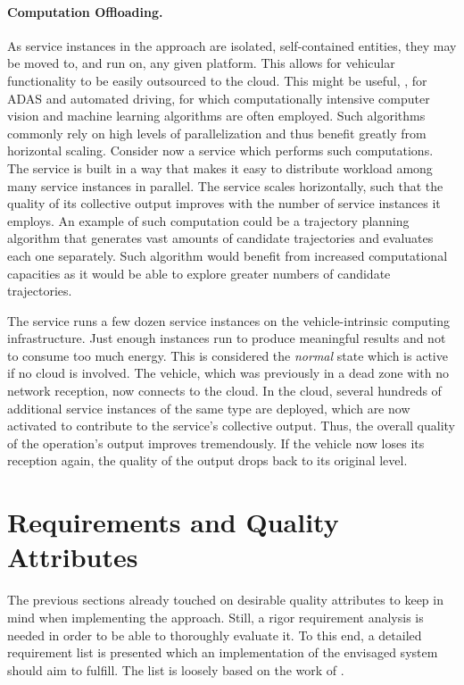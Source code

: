 \paragraph{Computation Offloading.}
As service instances in the approach are isolated, self-contained entities, they may be moved to, and run on, any given platform. This allows for vehicular functionality to be easily outsourced to the cloud. This might be useful, \eg , for ADAS and automated driving, for which computationally intensive computer vision and machine learning algorithms are often employed. Such algorithms commonly rely on high levels of parallelization and thus benefit greatly from horizontal scaling. Consider now a service which performs such computations. The service is built in a way that makes it easy to distribute workload among many service instances in parallel. The service scales horizontally, such that the quality of its collective output improves with the number of service instances it employs. An example of such computation could be a trajectory planning algorithm that generates vast amounts of candidate trajectories and evaluates each one separately. Such algorithm would benefit from increased computational capacities as it would be able to explore greater numbers of candidate trajectories.

The service runs a few dozen service instances on the vehicle-intrinsic computing infrastructure. Just enough instances run to produce meaningful results and not to consume too much energy. This is considered the \emph{normal} state which is active if no cloud is involved. The vehicle, which was previously in a dead zone with no network reception, now connects to the cloud. In the cloud, several hundreds of additional service instances of the same type are deployed, which are now activated to contribute to the service's collective output. Thus, the overall quality of the operation's output improves tremendously. If the vehicle now loses its reception again, the quality of the output drops back to its original level.

%
%
%
%
%
%
%
%
%
%
\section{Requirements and Quality Attributes} \label{sec:requirements}
The previous sections already touched on desirable quality attributes to keep in mind when implementing the approach. Still, a rigor requirement analysis is needed in order to be able to thoroughly evaluate it. To this end, a detailed requirement list is presented which an implementation of the envisaged system should aim to fulfill. The list is loosely based on the work of \citeauthor*{o2007quality} \cite{o2007quality}.

